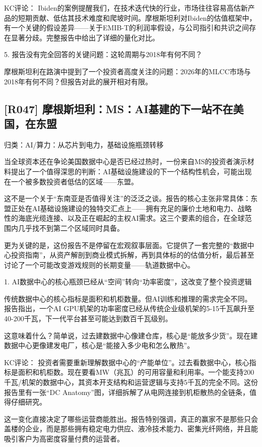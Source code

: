 \documentclass[11pt]{ctexart}
\begin{document}
KC评论： Ibiden的案例提醒我们，在技术迭代快的行业，市场往往容易高估新产品的短期贡献、低估其技术难度和爬坡时间。摩根斯坦利对Ibiden的估值框架中，有一个关键的假设差异——关于EMIB-T的利润率假设，与公司指引和共识之间存在显著分歧。完整报告中给出了详细的量化对比。

5. 报告没有完全回答的关键问题：这轮周期与2018年有何不同？

摩根斯坦利在路演中提到了一个投资者高度关注的问题：2026年的MLCC市场与2018年有何不同？但报告对此的展开相对有限。

\subsection{[R047] 摩根斯坦利：MS：AI基建的下一站不在美国，在东盟}
{\small\color{refgray}归类：AI/算力：从芯片到电力，基础设施瓶颈转移}

当全球资本还在争论美国数据中心是否已经过热时，一份来自MS的投资者演示材料提出了一个值得深思的判断：AI基础设施建设的下一个结构性机会，可能出现在一个被多数投资者低估的区域——东盟。

这不是一个关于“东南亚是否值得关注”的泛泛之谈。报告的核心主张非常具体：东盟正处在AI基础设施建设的独特交汇点上——拥有充足的廉价土地和电力、战略性的海底光缆连接、以及正在崛起的主权AI需求。这三个要素的组合，在全球范围内几乎找不到第二个区域同时具备。

更为关键的是，这份报告不是停留在宏观叙事层面。它提供了一套完整的“数据中心投资指南”，从资产解剖到商业模式拆解，再到具体标的的估值分析，最后甚至讨论了一个可能改变游戏规则的长期变量——轨道数据中心。

1. AI数据中心的核心瓶颈已经从“空间”转向“功率密度”，这改变了整个投资逻辑

传统数据中心的核心指标是面积和机柜数量。但AI训练和推理的需求完全不同。报告指出，一个AI GPU机架的功率密度已经从传统企业级机架的5-15千瓦飙升至40-200千瓦，下一代平台甚至可能达到数百千瓦级别。

这意味着什么？简单说，过去建数据中心像建仓库，核心是“能放多少货”。现在建数据中心更像建发电厂，核心是“能接入多少电和怎么散热”。

KC评论： 投资者需要重新理解数据中心的“产能单位”。过去看数据中心，核心指标是面积和机柜数。现在要看MW（兆瓦）的可用容量和利用率。一个能支持200千瓦/机架的数据中心，其资本开支结构和运营逻辑与支持5千瓦的完全不同。这份报告里有一张“DC Anatomy”图，详细拆解了从电网连接到机柜散热的全链条，值得仔细研究。

这一变化直接决定了哪些运营商能胜出。报告特别强调，真正的赢家不是那些只会盖楼的企业，而是那些拥有稳定电力供应、液冷技术能力、密集光纤网络，并且能吸引客户为高密度容量付费的运营者。
\end{document}
